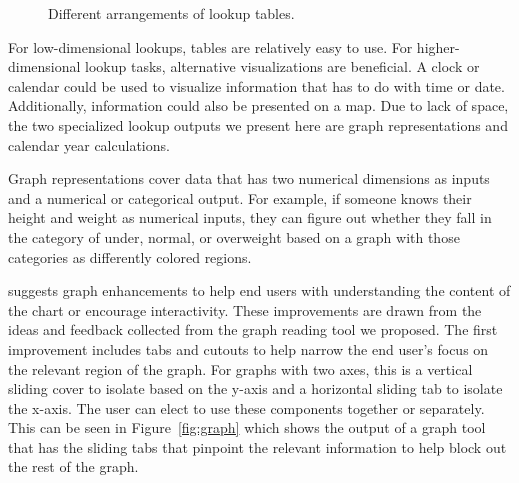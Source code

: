 \documentclass{sig-alternate}
\begin{document}
\begin{figure}%
    \centering
    \qquad
    \qquad
    \caption{Different arrangements of lookup tables.}%
    \label{fig:table}%
\end{figure}

For low-dimensional lookups, tables are relatively easy to use. For higher-dimensional lookup tasks, alternative visualizations are beneficial. A clock or calendar could be used to visualize information that has to do with time or date. Additionally, information could also be presented on a map. Due to lack of space, the two specialized lookup outputs we present here are graph representations and calendar year calculations.

Graph representations cover data that has two numerical dimensions as inputs and a numerical or categorical output. For example, if someone knows their height and weight as numerical inputs, they can figure out whether they fall in the category of under, normal, or overweight based on a graph with those categories as differently colored regions.

\nifty suggests graph enhancements to help end users with understanding the content of the chart or encourage interactivity. These improvements are drawn from the ideas and feedback collected from the graph reading tool we proposed. The first improvement includes tabs and cutouts to help narrow the end user's focus on the relevant region of the graph. For graphs with two axes, this is a vertical sliding cover to isolate based on the y-axis and a horizontal sliding tab to isolate the x-axis. The user can elect to use these components together or separately. This can be seen in Figure~\ref{fig:graph} which shows the output of a graph tool that has the sliding tabs that pinpoint the relevant information to help block out the rest of the graph. 
\end{document}
